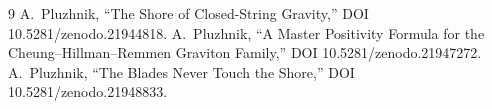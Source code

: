 \documentclass[11pt]{article}
\begin{document}
\begin{thebibliography}{9}
 A.~Pluzhnik, ``The Shore of Closed-String Gravity,''
DOI 10.5281/zenodo.21944818.
 A.~Pluzhnik, ``A Master Positivity Formula for the
Cheung--Hillman--Remmen Graviton Family,'' DOI 10.5281/zenodo.21947272.
 A.~Pluzhnik, ``The Blades Never Touch the Shore,''
DOI 10.5281/zenodo.21948833.
\end{thebibliography}
\end{document}
